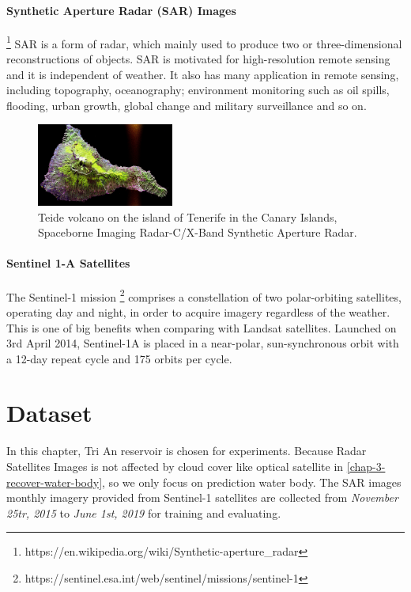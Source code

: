 \paragraph{Synthetic Aperture Radar (SAR) Images} \footnote{https://en.wikipedia.org/wiki/Synthetic-aperture\_radar} SAR is a form of radar, which mainly used to produce two or three-dimensional reconstructions of objects. SAR is motivated for high-resolution remote sensing and it is independent of weather. It also has many application in remote sensing, including topography, oceanography; environment monitoring such as oil spills, flooding, urban growth, global change and military surveillance and so on. 

\begin{figure}[h!]
	\centering
	\includegraphics[width=0.4\textwidth]{figures/TEIDE.jpg}
	\caption[]{Teide volcano on the island of Tenerife in the Canary Islands, Spaceborne Imaging Radar-C/X-Band Synthetic Aperture Radar.}
\end{figure}

\paragraph{Sentinel 1-A Satellites} The Sentinel-1 mission \footnote{https://sentinel.esa.int/web/sentinel/missions/sentinel-1} comprises a constellation of two polar-orbiting satellites, operating day and night, in order to acquire imagery regardless of the weather. This is one of big benefits when comparing with Landsat satellites. Launched on 3rd April 2014, Sentinel-1A is placed in a near-polar, sun-synchronous orbit with a 12-day repeat cycle and 175 orbits per cycle.

\section{Dataset} 

In this chapter, Tri An reservoir is chosen for experiments. Because Radar Satellites Images is not affected by cloud cover like optical satellite in \ref{chap-3-recover-water-body}, so we only focus on prediction water body. The SAR images monthly imagery provided from Sentinel-1 satellites are collected from \textit{November 25tr, 2015} to \textit{June 1st, 2019} for training and evaluating. 

